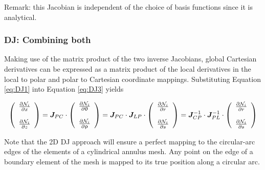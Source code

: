 Remark: this Jacobian is independent of the choice of basis functions since it is analytical.


\subsubsection{DJ: Combining both}

Making use of the matrix product of the two inverse Jacobians,
global Cartesian derivatives can be expressed as a matrix product of the local derivatives in the local to polar and polar to Cartesian coordinate mappings. Substituting Equation \eqref{eq:DJ1} into Equation \eqref{eq:DJ3} yields

\[
\left(
\begin{array}{c}
\frac{\partial {\mathcal{N}}_i}{\partial x} \\ \\
\frac{\partial {\mathcal{N}}_i}{\partial z} 
\end{array}
\right)
= 
{\bm J}_{PC} \cdot 
\left(
\begin{array}{c}
\frac{\partial {\mathcal{N}}_i}{\partial \uptheta} \\ \\
\frac{\partial {\mathcal{N}}_i}{\partial \uprho} 
\end{array}
\right)
=
{\bm J}_{PC} \cdot 
{\bm J}_{LP} \cdot 
\left(
\begin{array}{c}
\frac{\partial {\mathcal{N}}_i}{\partial r} \\ \\
\frac{\partial {\mathcal{N}}_i}{\partial s} 
\end{array}
\right)
=
{\bm J}_{CP}^{-1} \cdot 
{\bm J}_{PL}^{-1} \cdot 
\left(
\begin{array}{c}
\frac{\partial {\mathcal{N}}_i}{\partial r} \\ \\
\frac{\partial {\mathcal{N}}_i}{\partial s} 
\end{array}
\right)
\]

Note that the 2D DJ approach will ensure a perfect mapping to the circular-arc edges of the 
elements of a cylindrical annulus mesh.
Any point on the edge of a boundary element of the mesh is mapped to its true position along 
a circular arc.

